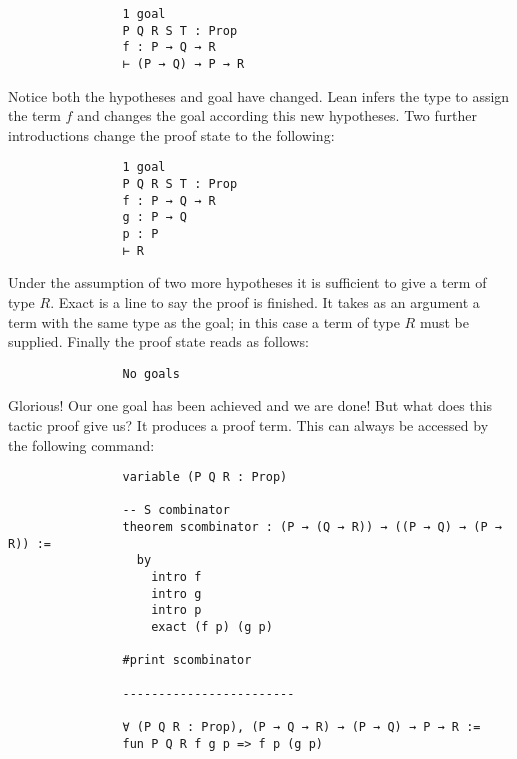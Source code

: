 \documentclass{book}
\begin{document}
\begin{eg}
        \begin{center}
            \begin{lstlisting}
                1 goal
                P Q R S T : Prop
                f : P → Q → R
                ⊢ (P → Q) → P → R
            \end{lstlisting}
        \end{center}

        Notice both the hypotheses and goal have changed. Lean infers the type to assign the term $f$ and changes the goal according this new hypotheses. Two further introductions change the proof state to the following: 

        \begin{center}
            \begin{lstlisting}
                1 goal
                P Q R S T : Prop
                f : P → Q → R
                g : P → Q
                p : P
                ⊢ R
            \end{lstlisting}
        \end{center}        
        
        Under the assumption of two more hypotheses it is sufficient to give a term of type $R$. Exact is a line to say the proof is finished. It takes as an argument a term with the same type as the goal; in this case a term of type $R$ must be supplied. Finally the proof state reads as follows: 

        \begin{center}
            \begin{lstlisting}
                No goals    
            \end{lstlisting}
        \end{center}        
        
        Glorious! Our one goal has been achieved and we are done! But what does this tactic proof give us? It produces a proof term. This can always be accessed by the following command: 

        \begin{center}
            \begin{lstlisting}
                variable (P Q R : Prop)

                -- S combinator
                theorem scombinator : (P → (Q → R)) → ((P → Q) → (P → R)) :=
                  by
                    intro f
                    intro g
                    intro p
                    exact (f p) (g p)
                
                #print scombinator 

                ------------------------
                
                ∀ (P Q R : Prop), (P → Q → R) → (P → Q) → P → R :=
                fun P Q R f g p => f p (g p)
            \end{lstlisting}            
        \end{center}    
    \end{eg}
\end{document}
